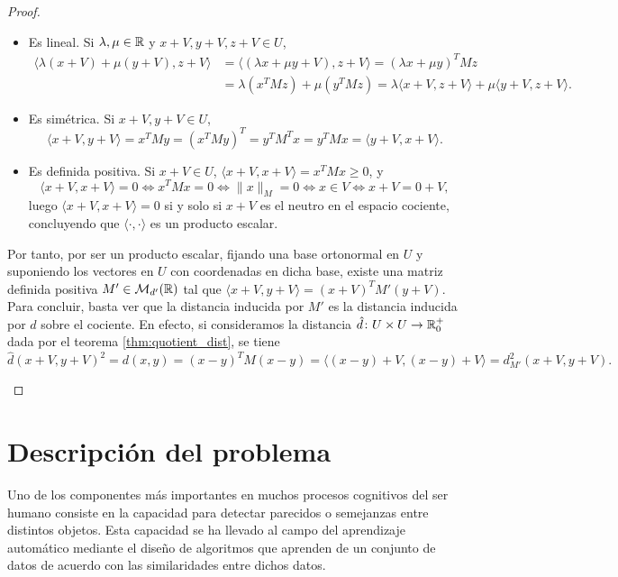 \begin{proof}
\begin{enumerate}
\begin{itemize}
            \item Es lineal. Si $\lambda, \mu \in \mathbb{R}$ y $x+V,y+V,z+V \in U$,
            \begin{align*}
             \langle \lambda(x+V) + \mu(y+V), z + V \rangle &= \langle (\lambda x + \mu y + V), z + V \rangle = (\lambda x + \mu y)^TMz \\
                                            & = \lambda(x^TMz)+\mu(y^TMz) = \lambda\langle x+V,z+V \rangle + \mu\langle y+V,z+V \rangle.
            \end{align*}
            \item Es simétrica. Si $x+V,y+V \in U$,
            \[ \langle x + V, y+V \rangle = x^TMy = (x^TMy)^T = y^TM^Tx = y^TMx = \langle y + V, x+V\rangle. \]

            \item Es definida positiva. Si $x + V \in U$, $\langle x + V, x + V \rangle = x^TMx \ge 0$, y
            \[ \langle x + V, x + V \rangle = 0 \iff x^TMx = 0 \iff \|x\|_M = 0 \iff x \in V \iff x+V = 0+V, \]
            luego $\langle x + V, x + V \rangle = 0$ si y solo si $x+V$ es el neutro en el espacio cociente, concluyendo que $\langle \cdot, \cdot \rangle$ es un producto escalar.
        \end{itemize}

        Por tanto, por ser un producto escalar, fijando una base ortonormal en $U$ y suponiendo los vectores en $U$ con coordenadas en dicha base, existe una matriz definida positiva $M' \in \mathcal{M}_{d'}(\mathbb{R})$ tal que $\langle x+V, y+V \rangle = (x+V)^TM'(y+V)$. Para concluir, basta ver que la distancia inducida por $M'$ es la distancia inducida por $d$ sobre el cociente. En efecto, si consideramos la distancia $\hat{d}\colon U \times U \to \mathbb{R}^+_0$ dada por el teorema \ref{thm:quotient_dist}, se tiene
        \[\hat{d}(x+V,y+V)^2 = d(x,y) = (x-y)^TM(x-y) = \langle (x-y)+V, (x-y)+V \rangle = d_{M'}^2(x+V,y+V).\]

    \end{enumerate}
\end{proof}


\section{Descripción del problema}
    Uno de los componentes más importantes en muchos procesos cognitivos del ser humano consiste en la capacidad para detectar parecidos o semejanzas entre distintos objetos. Esta capacidad se ha llevado al campo del aprendizaje automático mediante el diseño de algoritmos que aprenden de un conjunto de datos de acuerdo con las similaridades entre dichos datos.

